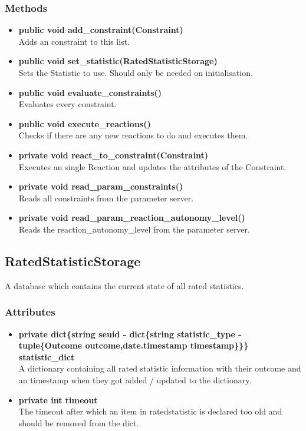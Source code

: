 \subsubsection{Methods}
\begin{itemize}
	\item \textbf{ public void add\_constraint(Constraint)  }\\
		Adds an constraint to this list.
	\item \textbf{ public void set\_statistic(RatedStatisticStorage)  }\\
		Sets the Statistic to use. Should only be needed on initialisation.
	\item \textbf{ public void evaluate\_constraints()  }\\
		Evaluates every constraint.
	\item \textbf{ public void execute\_reactions()  }\\
		Checks if there are any new reactions to do and executes them.
	\item \textbf{ private void react\_to\_constraint(Constraint)  }\\
		Executes an single Reaction and updates the attributes of the Constraint.
	\item \textbf{ private void read\_param\_constraints()  }\\
		Reads all constraints from the parameter server.
	\item \textbf{ private void read\_param\_reaction\_autonomy\_level()  }\\
		Reads the reaction\_autonomy\_level from the parameter server.
\end{itemize}


\subsection{RatedStatisticStorage}
A database which contains the current state of all rated statistics.
\subsubsection{Attributes}
\begin{itemize}
	\item \textbf{ private dict\{string seuid - dict\{string statistic\_type - tuple\{Outcome outcome,date.timestamp timestamp\}\}\} statistic\_dict }\\
		A dictionary containing all rated statistic information with their outcome and an timestamp when they got added / updated to the dictionary.
	\item \textbf{ private int timeout }\\
		The timeout after which an item in ratedstatistic is declared too old and should be removed from the dict.
\end{itemize}
